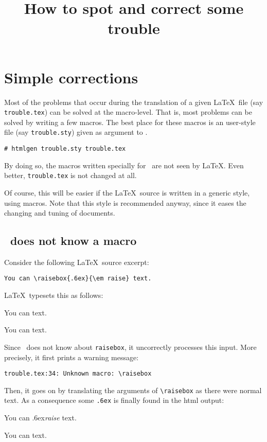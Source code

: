 \documentclass{article}
\title{How to spot and correct some trouble}
\begin{document}
\maketitle

\section{Simple corrections}
Most of the problems that occur during the translation of a given
\LaTeX\ file (say \verb+trouble.tex+) can be solved at
the macro-level. That is, most problems can be solved by writing a few
macros. The best place for these macros is an user-style file (say
\verb+trouble.sty+) given as
argument to \htmlgen.
\begin{verbatim}
# htmlgen trouble.sty trouble.tex
\end{verbatim}
By doing so, the macros written specially for \htmlgen\ are not
seen by \LaTeX. Even better, \verb+trouble.tex+ is not changed
at all.

Of course, this will be easier if the \LaTeX\ source is written in a
generic style, using macros.
Note that this style is recommended anyway, since it eases the changing
and tuning of documents.

\subsection{\htmlgen\ does not know a macro}
Consider the following \LaTeX\ source excerpt:
\begin{verbatim}
You can \raisebox{.6ex}{\em raise} text.
\end{verbatim}

\LaTeX\ typesets this as follows:
\begin{htmlout}
\begin{htmlonly}
You can \raisebox{.6ex}{\em raise} text.
\imageflush
\end{htmlonly}      
\begin{latexonly}
You can \raisebox{.6ex}{\em raise} text.
\end{latexonly}
\end{htmlout}

Since \htmlgen\ does not know about \verb+raisebox+,
it uncorrectly processes this input. More precisely,
it first prints a warning message:
\begin{verbatim}
trouble.tex:34: Unknown macro: \raisebox
\end{verbatim}
Then, it goes on by translating the arguments of \verb+\raisebox+ as
there were normal text. As a
consequence some \verb+.6ex+ is finally found in the html output:
\begin{htmlout}
\begin{latexonly}
You can .6ex{\em raise} text.
\end{latexonly}
\begin{htmlonly}
You can \raisebox{.6ex}{\em raise} text.
\end{htmlonly}
\end{htmlout}
\end{document}
